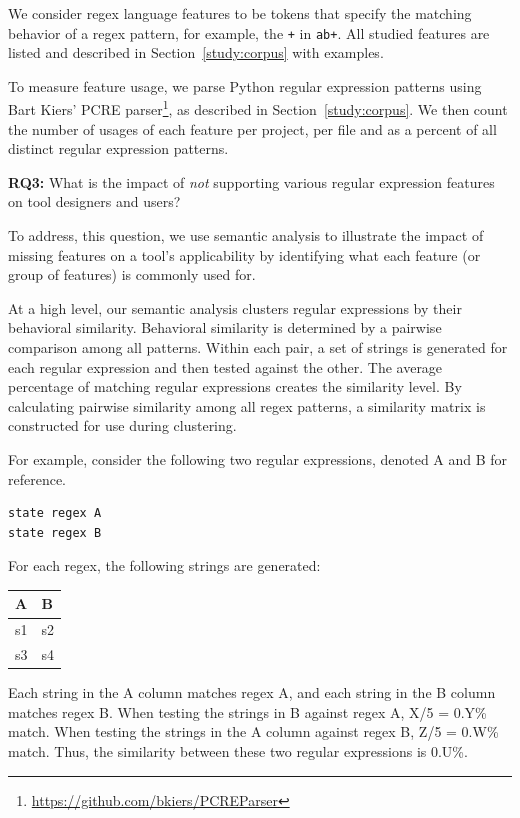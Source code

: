We consider regex language features to be tokens that specify the matching behavior of a regex pattern, for example,  the {\tt +} in {\tt ab+}.  All studied features are listed and described in Section~\ref{study:corpus} with examples.

To measure feature usage, we parse Python regular expression patterns using Bart Kiers' PCRE parser\footnote{\url{https://github.com/bkiers/PCREParser}}, as described in Section~\ref{study:corpus}.  We then count the number of usages of each feature per project, per file and as a percent of all distinct regular expression patterns.

\textbf{RQ3:} What is the impact of \emph{not} supporting various regular expression features on tool designers and users?

To address, this question, we use semantic analysis to illustrate the impact of missing features on a tool's applicability by identifying what each feature (or group of features) is commonly used for.

At a high level, our semantic analysis clusters regular expressions by their behavioral similarity. Behavioral similarity is determined by a pairwise comparison among all patterns. Within each pair, a set of strings is generated for each regular expression and then tested against the other. The average percentage of matching regular expressions creates the similarity level. By calculating pairwise similarity among all regex patterns, a similarity matrix is constructed for use during clustering.

For example, consider the following two regular expressions, denoted A and B for reference.

\begin{verbatim}
state regex A
state regex B
\end{verbatim}

For each regex, the following strings are generated:

\begin{tabular}{l | l}
A & B \\ \hline
s1 & s2 \\
s3 & s4 \\
\end{tabular}

Each string in the A column matches regex A, and each string in the B column matches regex B. When testing the strings in B against regex A, X/5 = 0.Y\% match. When testing the strings in the A column against regex B, Z/5 = 0.W\% match. Thus, the similarity between these two regular expressions is 0.U\%.

